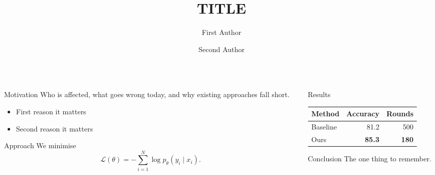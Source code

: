 \documentclass[final]{beamer}
\title{{{TITLE}}}
\author{First Author \and Second Author}
\institute{University One}
\begin{document}
\begin{frame}[t]

  \vspace{1.5cm}
  \begin{center}
    {\VeryHuge\bfseries\color{ink}\inserttitle\par}\vspace{1cm}
    {\Large\insertauthor\par}\vspace{0.3cm}
    {\large\color{accent}\insertinstitute\par}
  \end{center}
  \vspace{1.5cm}

  \begin{columns}[t]
    \begin{column}{0.46\paperwidth}
      \begin{block}{Motivation}
        Who is affected, what goes wrong today, and why existing approaches fall short.
        \begin{itemize}
          \item First reason it matters
          \item Second reason it matters
        \end{itemize}
      \end{block}
      \vspace{1cm}
      \begin{block}{Approach}
        We minimise
        \[ \mathcal{L}(\theta) = -\sum_{i=1}^{N} \log p_\theta(y_i \mid x_i). \]
      \end{block}
    \end{column}
    \begin{column}{0.46\paperwidth}
      \begin{block}{Results}
        \centering
        \begin{tabular}{lrr}
          \toprule
          Method & Accuracy & Rounds \\
          \midrule
          Baseline & 81.2 & 500 \\
          Ours & \textbf{85.3} & \textbf{180} \\
          \bottomrule
        \end{tabular}
      \end{block}
      \vspace{1cm}
      \begin{block}{Conclusion}
        The one thing to remember.
      \end{block}
    \end{column}
  \end{columns}

\end{frame}
\end{document}
